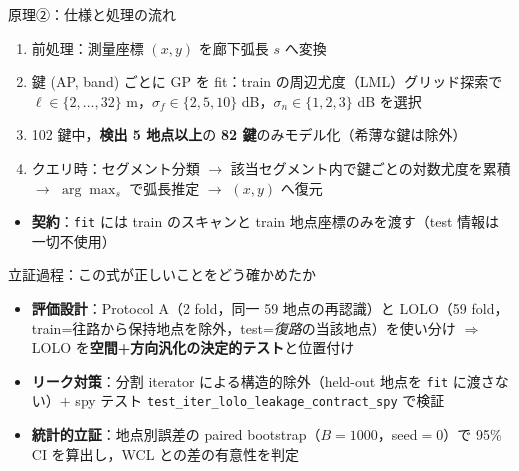 \documentclass[aspectratio=169,unicode,10pt]{beamer}
\begin{document}
\begin{frame}{原理②：仕様と処理の流れ}
  \small
  \begin{enumerate}
    \item 前処理：測量座標 $(x,y)$ を廊下弧長 $s$ へ変換
    \item 鍵 (AP, band) ごとに GP を fit：train の周辺尤度（LML）グリッド探索で $\ell\in\{2,\dots,32\}$ m，$\sigma_f\in\{2,5,10\}$ dB，$\sigma_n\in\{1,2,3\}$ dB を選択
    \item 102 鍵中，\textbf{検出 5 地点以上}の \textbf{82 鍵}のみモデル化（希薄な鍵は除外）
    \item クエリ時：セグメント分類 $\to$ 該当セグメント内で鍵ごとの対数尤度を累積 $\to$ $\arg\max_s$ で弧長推定 $\to$ $(x,y)$ へ復元
  \end{enumerate}
  \vspace{4pt}
  \begin{itemize}\small
    \item \textbf{契約}：\texttt{fit} には train のスキャンと train 地点座標のみを渡す（test 情報は一切不使用）
  \end{itemize}
\end{frame}

\begin{frame}{立証過程：この式が正しいことをどう確かめたか}
  \begin{itemize}
    \item \textbf{評価設計}：Protocol A（2 fold，同一 59 地点の再認識）と LOLO（59 fold，train=往路から保持地点を除外，test=\emph{復路}の当該地点）を使い分け $\Rightarrow$ LOLO を\textbf{空間+方向汎化の決定的テスト}と位置付け
    \item \textbf{リーク対策}：分割 iterator による構造的除外（held-out 地点を \texttt{fit} に渡さない）$+$ spy テスト \texttt{test\_iter\_lolo\_leakage\_contract\_spy} で検証
    \item \textbf{統計的立証}：地点別誤差の paired bootstrap（$B{=}1000$，seed$=$0）で 95\% CI を算出し，WCL との差の有意性を判定\cite{hara2010statloc}
  \end{itemize}
\end{frame}
\end{document}
